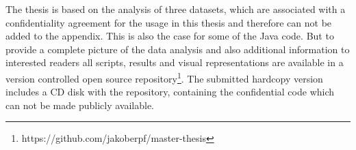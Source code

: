 \bigskip

\bigskip

\bigskip

The thesis is based on the analysis of three datasets, which are associated with a confidentiality agreement for the usage in this thesis and therefore can not be added to the appendix. This is also the case for some of the Java code. But to provide a complete picture of the data analysis and also additional information to interested readers all scripts, results and visual representations are available in a version controlled open source repository\footnote{https://github.com/jakoberpf/master-thesis}. The submitted hardcopy version includes a CD disk with the repository, containing the confidential code which can not be made publicly available.
